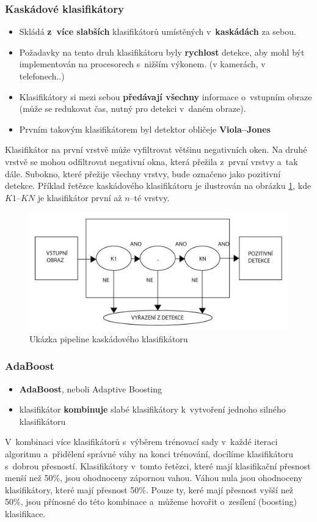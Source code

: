 \subsubsection{Kaskádové klasifikátory} %
\begin{itemize}
  \item Skládá \textbf{z~více slabších} klasifikátorů umístěných v~\textbf{kaskádách} za sebou.
  \item Požadavky na tento druh klasifikátoru byly \textbf{rychlost} detekce, aby mohl být implementován na procesorech s~nižším výkonem. (v kamerách, v telefonech..)
  \item Klasifikátory si mezi sebou \textbf{předávají všechny} informace o~vstupním obraze (může se redukovat čas, nutný pro detekci v~daném obraze).
  \item Prvním takovým klasifikátorem byl detektor obličeje \textbf{Viola--Jones}
\end{itemize}
Klasifikátor na první vrstvě může vyfiltrovat většinu negativních oken. Na druhé vrstvě se mohou odfiltrovat  negativní okna, která přežila z~první vrstvy a~tak dále. Subokno, které přežije všechny vrstvy, bude označeno jako pozitivní detekce. Příklad řetězce kaskádového klasifikátoru je ilustrován na obrázku \ref{fig:ccpipeline}, kde $K1$--$KN$ je klasifikátor první až $n$--té vrstvy.

\begin{figure}[H]
\centering
\includegraphics[width=.6\linewidth]{assets/9_cascadeClass.pdf}
\caption{Ukázka pipeline kaskádového klasifikátoru}
\label{fig:ccpipeline}
\end{figure}

\subsubsection{AdaBoost}
\begin{itemize}
  \item \textbf{AdaBoost}, neboli Adaptive Boosting
  \item klasifikátor \textbf{kombinuje} slabé klasifikátory k~vytvoření jednoho silného klasifikátoru
\end{itemize}
V~kombinaci více klasifikátorů s~výběrem trénovací sady v~každé iteraci algoritmu a~přidělení správné váhy na konci trénování, docílíme klasifikátoru s~dobrou přesností. Klasifikátory v~tomto řetězci, které mají klasifikační přesnost menší než 50\%, jsou ohodnoceny zápornou vahou. Váhou nula jsou ohodnoceny klasifikátory, které mají přesnost 50\%. Pouze ty, keré mají přesnost vyšší než 50\%, jsou přínosné do této kombinace a~můžeme hovořit o~zesílení (boosting) klasifikace. 

